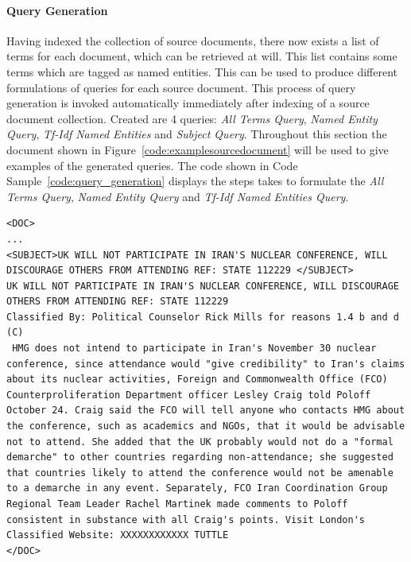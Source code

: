 \documentclass{l4proj}
\newenvironment{codelisting}{\captionsetup{type=listing}}{}
\begin{document}
\paragraph{Query Generation} \label{querygen}
Having indexed the collection of source documents, there now exists a list of terms for each document, which can be retrieved at will.
This list contains some terms which are tagged as named entities. This can be used to produce different formulations of queries for each source document. This process of query generation is invoked automatically immediately after indexing of a source document collection.
Created are 4 queries: \textit{All Terms Query}, \textit{Named Entity Query}, \textit{Tf-Idf Named Entities} and \textit{Subject Query}.
Throughout this section the document shown in Figure~\ref{code:examplesourcedocument} will be used to give examples of the generated queries.
The code shown in Code Sample~\ref{code:query_generation} displays the steps takes to formulate the \textit{All Terms Query}, \textit{Named Entity Query} and \textit{Tf-Idf Named Entities Query}.
\begin{codelisting}
\begin{verbatim}
<DOC>
...
<SUBJECT>UK WILL NOT PARTICIPATE IN IRAN'S NUCLEAR CONFERENCE, WILL DISCOURAGE OTHERS FROM ATTENDING REF: STATE 112229 </SUBJECT>
UK WILL NOT PARTICIPATE IN IRAN'S NUCLEAR CONFERENCE, WILL DISCOURAGE OTHERS FROM ATTENDING REF: STATE 112229
Classified By: Political Counselor Rick Mills for reasons 1.4 b and d (C)
 HMG does not intend to participate in Iran's November 30 nuclear conference, since attendance would "give credibility" to Iran's claims about its nuclear activities, Foreign and Commonwealth Office (FCO) Counterproliferation Department officer Lesley Craig told Poloff October 24. Craig said the FCO will tell anyone who contacts HMG about the conference, such as academics and NGOs, that it would be advisable not to attend. She added that the UK probably would not do a "formal demarche" to other countries regarding non-attendance; she suggested that countries likely to attend the conference would not be amenable to a demarche in any event. Separately, FCO Iran Coordination Group Regional Team Leader Rachel Martinek made comments to Poloff consistent in substance with all Craig's points. Visit London's Classified Website: XXXXXXXXXXXX TUTTLE
</DOC>
\end{verbatim}
\label{code:examplesourcedocument}
\end{codelisting}
\end{document}
